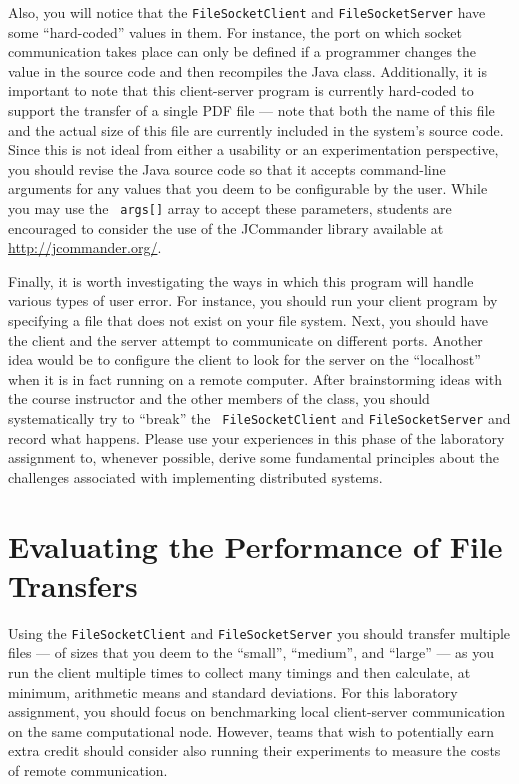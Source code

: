 Also, you will notice that the {\tt FileSocketClient} and {\tt FileSocketServer} have some ``hard-coded'' values in
them. For instance, the port on which socket communication takes place can only be defined if a programmer changes the
value in the source code and then recompiles the Java class. Additionally, it is important to note that this
client-server program is currently hard-coded to support the transfer of a single PDF file --- note that both the name
of this file and the actual size of this file are currently included in the system's source code.  Since this is not
ideal from either a usability or an experimentation perspective, you should revise the Java source code so that it
accepts command-line arguments for any values that you deem to be configurable by the user. While you may use the {\tt
args[]} array to accept these parameters, students are encouraged to consider the use of the JCommander library
available at \url{http://jcommander.org/}.

Finally, it is worth investigating the ways in which this program will handle various types of user error. For instance,
you should run your client program by specifying a file that does not exist on your file system. Next, you should have
the client and the server attempt to communicate on different ports. Another idea would be to configure the client to
look for the server on the ``localhost'' when it is in fact running on a remote computer. After brainstorming ideas with
the course instructor and the other members of the class, you should systematically try to ``break'' the {\tt
FileSocketClient} and {\tt FileSocketServer} and record what happens. Please use your experiences in this phase of the
laboratory assignment to, whenever possible, derive some fundamental principles about the challenges associated with
implementing distributed systems.

\section*{Evaluating the Performance of File Transfers}

Using the {\tt FileSocketClient} and {\tt FileSocketServer} you should transfer multiple files --- of sizes that you
deem to the ``small'', ``medium'', and ``large'' --- as you run the client multiple times to collect many timings and
then calculate, at minimum, arithmetic means and standard deviations.  For this laboratory assignment, you should focus
on benchmarking local client-server communication on the same computational node. However, teams that wish to
potentially earn extra credit should consider also running their experiments to measure the costs of remote
communication.

